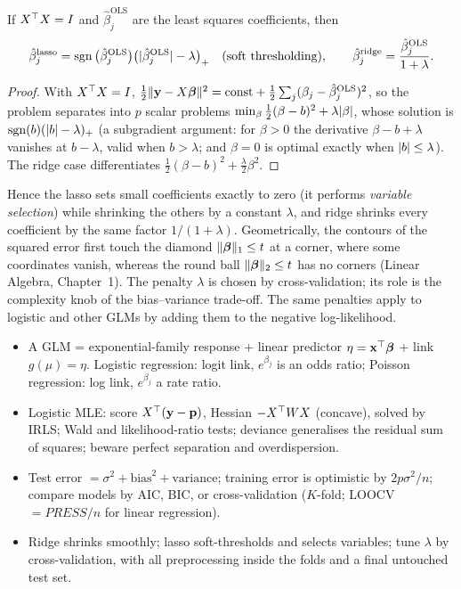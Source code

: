 \begin{theorem}\label{thm:lasso}
If $X^{\top} X=I$ and $\hat\beta_j^{\mathrm{OLS}}$ are the least squares coefficients, then
\[ \hat\beta_j^{\mathrm{lasso}}=\operatorname{sgn}\big(\hat\beta_j^{\mathrm{OLS}}\big)\big(\lvert\hat\beta_j^{\mathrm{OLS}}\rvert-\lambda\big)_+\quad\text{(soft thresholding)},\qquad\hat\beta_j^{\mathrm{ridge}}=\frac{\hat\beta_j^{\mathrm{OLS}}}{1+\lambda}. \]
\end{theorem}

\begin{proof}
With $X^{\top} X=I$, $\tfrac12\lVert\mathbf{y}-X\boldsymbol\beta\rVert^2=\text{const}+\tfrac12\sum_j(\beta_j-\hat\beta_j^{\mathrm{OLS}})^2$, so the problem separates into $p$ scalar problems $\min_\beta\tfrac12(\beta-b)^2+\lambda\lvert\beta\rvert$, whose solution is $\operatorname{sgn}(b)(\lvert b\rvert-\lambda)_+$ (a subgradient argument: for $\beta>0$ the derivative $\beta-b+\lambda$ vanishes at $b-\lambda$, valid when $b>\lambda$; and $\beta=0$ is optimal exactly when $\lvert b\rvert\le\lambda$). The ridge case differentiates $\tfrac12(\beta-b)^2+\tfrac\lambda2\beta^2$.
\end{proof}

Hence the lasso sets small coefficients exactly to zero (it performs \emph{variable selection}) while shrinking the others by a constant $\lambda$, and ridge shrinks every coefficient by the same factor $1/(1+\lambda)$. Geometrically, the contours of the squared error first touch the diamond $\lVert\boldsymbol\beta\rVert_1\le t$ at a corner, where some coordinates vanish, whereas the round ball $\lVert\boldsymbol\beta\rVert_2\le t$ has no corners (Linear Algebra, Chapter~1). The penalty $\lambda$ is chosen by cross-validation; its role is the complexity knob of the bias--variance trade-off. The same penalties apply to logistic and other GLMs by adding them to the negative log-likelihood.

\begin{summarybox}
\begin{itemize}
  \item A GLM = exponential-family response + linear predictor $\eta=\mathbf{x}^{\top}\boldsymbol\beta$ + link $g(\mu)=\eta$. Logistic regression: logit link, $e^{\beta_j}$ is an odds ratio; Poisson regression: log link, $e^{\beta_j}$ a rate ratio.
  \item Logistic MLE: score $X^{\top}(\mathbf{y}-\mathbf{p})$, Hessian $-X^{\top} WX$ (concave), solved by IRLS; Wald and likelihood-ratio tests; deviance generalises the residual sum of squares; beware perfect separation and overdispersion.
  \item Test error $=\sigma^2+\text{bias}^2+\text{variance}$; training error is optimistic by $2p\sigma^2/n$; compare models by AIC, BIC, or cross-validation ($K$-fold; LOOCV $=PRESS/n$ for linear regression).
  \item Ridge shrinks smoothly; lasso soft-thresholds and selects variables; tune $\lambda$ by cross-validation, with all preprocessing inside the folds and a final untouched test set.
\end{itemize}
\end{summarybox}

